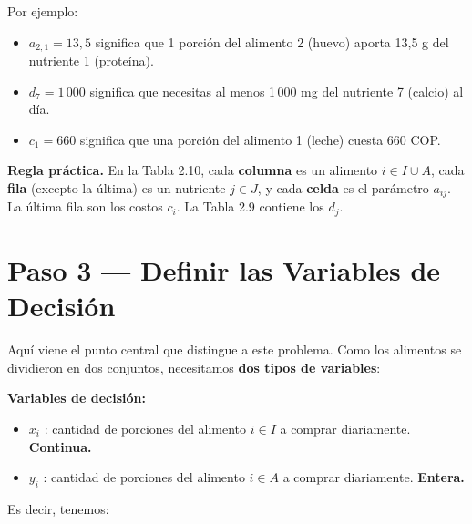 \documentclass[12pt]{article}
\begin{document}
Por ejemplo:
\begin{itemize}
    \item $a_{2,1} = 13{,}5$ significa que 1 porci\'on del alimento 2 (huevo) aporta 13,5 g del nutriente 1 (prote\'ina).
    \item $d_7 = 1\,000$ significa que necesitas al menos 1\,000 mg del nutriente 7 (calcio) al d\'ia.
    \item $c_1 = 660$ significa que una porci\'on del alimento 1 (leche) cuesta 660 COP.
\end{itemize}

\begin{cajaverde}
\textbf{Regla pr\'actica.} En la Tabla 2.10, cada \textbf{columna} es un alimento $i \in I \cup A$, cada \textbf{fila} (excepto la \'ultima) es un nutriente $j \in J$, y cada \textbf{celda} es el par\'ametro $a_{ij}$. La \'ultima fila son los costos $c_i$. La Tabla 2.9 contiene los $d_j$.
\end{cajaverde}

\section{Paso 3 --- Definir las Variables de Decisi\'on}

Aqu\'i viene el punto central que distingue a este problema. Como los alimentos se dividieron en dos conjuntos, necesitamos \textbf{dos tipos de variables}:

\begin{cajazul}
\textbf{Variables de decisi\'on:}
\begin{itemize}
    \item $x_i$ : cantidad de porciones del alimento $i \in I$ a comprar diariamente. \textbf{Continua.}
    \item $y_i$ : cantidad de porciones del alimento $i \in A$ a comprar diariamente. \textbf{Entera.}
\end{itemize}
\end{cajazul}

Es decir, tenemos:
\end{document}
